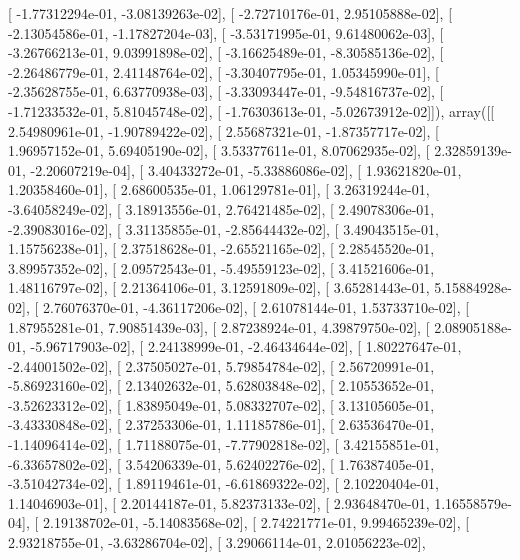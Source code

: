\documentclass{article}
\begin{document}
       [ -1.77312294e-01,  -3.08139263e-02],
       [ -2.72710176e-01,   2.95105888e-02],
       [ -2.13054586e-01,  -1.17827204e-03],
       [ -3.53171995e-01,   9.61480062e-03],
       [ -3.26766213e-01,   9.03991898e-02],
       [ -3.16625489e-01,  -8.30585136e-02],
       [ -2.26486779e-01,   2.41148764e-02],
       [ -3.30407795e-01,   1.05345990e-01],
       [ -2.35628755e-01,   6.63770938e-03],
       [ -3.33093447e-01,  -9.54816737e-02],
       [ -1.71233532e-01,   5.81045748e-02],
       [ -1.76303613e-01,  -5.02673912e-02]]), array([[  2.54980961e-01,  -1.90789422e-02],
       [  2.55687321e-01,  -1.87357717e-02],
       [  1.96957152e-01,   5.69405190e-02],
       [  3.53377611e-01,   8.07062935e-02],
       [  2.32859139e-01,  -2.20607219e-04],
       [  3.40433272e-01,  -5.33886086e-02],
       [  1.93621820e-01,   1.20358460e-01],
       [  2.68600535e-01,   1.06129781e-01],
       [  3.26319244e-01,  -3.64058249e-02],
       [  3.18913556e-01,   2.76421485e-02],
       [  2.49078306e-01,  -2.39083016e-02],
       [  3.31135855e-01,  -2.85644432e-02],
       [  3.49043515e-01,   1.15756238e-01],
       [  2.37518628e-01,  -2.65521165e-02],
       [  2.28545520e-01,   3.89957352e-02],
       [  2.09572543e-01,  -5.49559123e-02],
       [  3.41521606e-01,   1.48116797e-02],
       [  2.21364106e-01,   3.12591809e-02],
       [  3.65281443e-01,   5.15884928e-02],
       [  2.76076370e-01,  -4.36117206e-02],
       [  2.61078144e-01,   1.53733710e-02],
       [  1.87955281e-01,   7.90851439e-03],
       [  2.87238924e-01,   4.39879750e-02],
       [  2.08905188e-01,  -5.96717903e-02],
       [  2.24138999e-01,  -2.46434644e-02],
       [  1.80227647e-01,  -2.44001502e-02],
       [  2.37505027e-01,   5.79854784e-02],
       [  2.56720991e-01,  -5.86923160e-02],
       [  2.13402632e-01,   5.62803848e-02],
       [  2.10553652e-01,  -3.52623312e-02],
       [  1.83895049e-01,   5.08332707e-02],
       [  3.13105605e-01,  -3.43330848e-02],
       [  2.37253306e-01,   1.11185786e-01],
       [  2.63536470e-01,  -1.14096414e-02],
       [  1.71188075e-01,  -7.77902818e-02],
       [  3.42155851e-01,  -6.33657802e-02],
       [  3.54206339e-01,   5.62402276e-02],
       [  1.76387405e-01,  -3.51042734e-02],
       [  1.89119461e-01,  -6.61869322e-02],
       [  2.10220404e-01,   1.14046903e-01],
       [  2.20144187e-01,   5.82373133e-02],
       [  2.93648470e-01,   1.16558579e-04],
       [  2.19138702e-01,  -5.14083568e-02],
       [  2.74221771e-01,   9.99465239e-02],
       [  2.93218755e-01,  -3.63286704e-02],
       [  3.29066114e-01,   2.01056223e-02],
\end{document}
